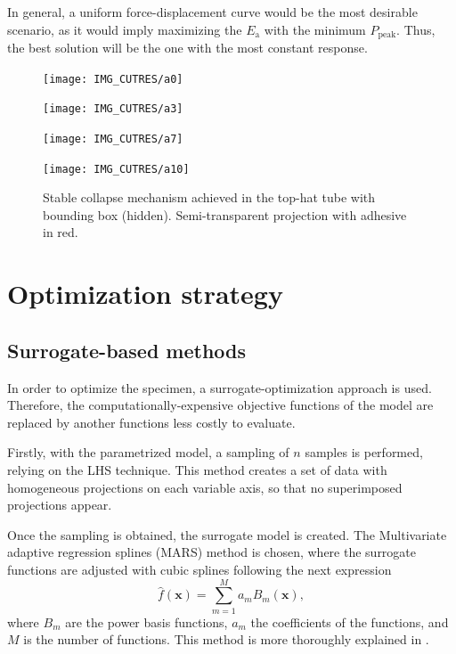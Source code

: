 \documentclass[cmfonts]{witpress}
\begin{document}
In general, a uniform force-displacement curve would be the most desirable scenario, as it would imply maximizing the $E_\text{a}$  with the minimum $P_\text{peak}$. Thus, the best solution will be the one with the most constant response.

\begin{figure}
	\centering
	\begin{minipage}[b]{.15\linewidth}
		\centering
		\texttt{[image: IMG\_CUTRES/a0]}
	\end{minipage}
	\hfill
	\begin{minipage}[b]{.15\linewidth}
		\centering
		\texttt{[image: IMG\_CUTRES/a3]}
	\end{minipage}
	\hfill
	\begin{minipage}[b]{.15\linewidth}
		\centering
		\texttt{[image: IMG\_CUTRES/a7]}
	\end{minipage}
	\hfill
	\begin{minipage}[b]{.15\linewidth}
		\centering
		\texttt{[image: IMG\_CUTRES/a10]}
	\end{minipage}
	\caption[Stable collapse mechanism achieved in the top-hat tube with bounding box.]{Stable collapse mechanism achieved in the top-hat tube with bounding box (hidden). Semi-transparent projection with adhesive in red.}
	\label{fig:stable}
\end{figure}

\section{Optimization strategy}

\subsection{Surrogate-based methods}

In order to optimize the specimen, a surrogate-optimization approach is used. Therefore, the computationally-expensive  objective functions of the model are replaced by another functions less costly to evaluate. 

Firstly, with the parametrized model, a sampling of $n$ samples is performed, relying on the LHS technique. This method creates a set of data with homogeneous projections on each variable axis, so that no superimposed projections appear. 

Once the sampling is obtained, the surrogate model is created. The Multivariate adaptive regression splines (MARS) method is chosen, where the surrogate functions are adjusted with cubic splines following the next expression
\begin{equation}\label{eq:mars}
\hat{f}\left ( \bm{x} \right )= \sum_{m=1}^{M}a_{m}B_{m}\left ( \bm{x} \right ),
\end{equation}
where $B_{m}$ are the power basis functions, $a_{m}$ the coefficients of the functions, and $M$ is the number of functions. This method is more thoroughly explained in \cite{Friedman1995197}. 
\end{document}
